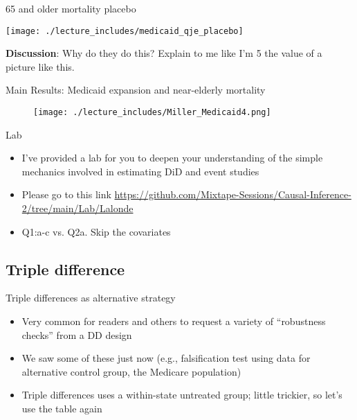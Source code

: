 \documentclass{beamer}
\begin{document}
\begin{frame}{65 and older mortality placebo}

	\texttt{[image: ./lecture\_includes/medicaid\_qje\_placebo]}

\textbf{Discussion}: Why do they do this?  Explain to me like I'm 5 the value of a picture like this.

\end{frame}
\begin{frame}{Main Results: Medicaid expansion and near-elderly mortality}

	\begin{figure}
	\texttt{[image: ./lecture\_includes/Miller\_Medicaid4.png]}
	\end{figure}

\end{frame}

\begin{frame}{Lab}

\begin{itemize}

\item I've provided a lab for you to deepen your understanding of the simple mechanics involved in estimating DiD and event studies
\item Please go to this link \url{https://github.com/Mixtape-Sessions/Causal-Inference-2/tree/main/Lab/Lalonde}
\item Q1:a-c vs. Q2a.  Skip the covariates

\end{itemize}

\end{frame}

\subsection{Triple difference}

\begin{frame}{Triple differences as alternative strategy}
	
	\begin{itemize}
	\item Very common for readers and others to request a variety of ``robustness checks'' from a DD design
	\item We saw some of these just now (e.g., falsification test using data for alternative control group, the Medicare population)
	\item Triple differences uses a within-state untreated group; little trickier, so let's use the table again
	\end{itemize}
\end{frame}
\end{document}
